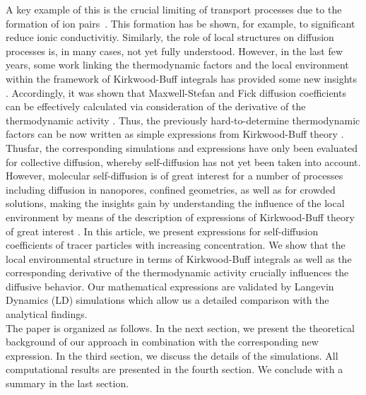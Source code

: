 \documentclass[aip,jcp,reprint]{revtex4-1}
\begin{document}
A key example of this is the crucial limiting of transport processes due to the formation of ion pairs~\cite{marcus06a,vanderVegt16a,smiatek18a,smiatek20a,narayanan18a,smiatek20b,miranda20a,yang20a,krishnamoorthy18b,smiatek19a}.
This formation has be shown, for example, to significant reduce ionic conductivitiy\cite{schroder09a,krishnamoorthy16a,smiatek18a,smiatek20a,krishnamoorthy18c,nandy19a}.
Similarly, the role of local structures on diffusion processes is, in many cases, not yet fully understood. However, in the last few years, some work linking the thermodynamic factors and the local environment within the framework of Kirkwood-Buff integrals has provided some new insights \cite{bardow15a,guevara16a,janzen17a,liu11a,liu13a,rosenberger20a}. Accordingly, it was shown that Maxwell-Stefan and Fick diffusion coefficients can be effectively calculated via consideration of the derivative of the thermodynamic activity \cite{bardow15a,guevara16a,janzen17a,liu11a,liu13a,rosenberger20a}. Thus, the previously hard-to-determine thermodynamic factors can be now written as simple expressions from Kirkwood-Buff theory \cite{kirkwood51,ben13a,pierce08a,smith06,smiatek17a,zingrebe18b,simon22a}. Thusfar, the corresponding simulations and expressions have only been evaluated for collective diffusion, whereby self-diffusion has not yet been taken into account. However,  molecular self-diffusion is of great interest for a number of processes including diffusion in nanopores, confined geometries, as well as for crowded solutions, making the insights gain by understanding the influence of the local environment by means of the description of expressions of Kirkwood-Buff theory of great interest \cite{simon22a,jamali18a,jamali20a,roosen11a,dix08a}.
In this article, we present expressions for self-diffusion coefficients of tracer particles with increasing concentration. We show that the local environmental structure in terms of Kirkwood-Buff integrals as well as the corresponding derivative of the thermodynamic activity crucially influences the diffusive behavior.  Our mathematical expressions are validated by Langevin Dynamics (LD) simulations which allow us a detailed comparison with the analytical findings. \\
The paper is organized as follows. In the next section, we present the theoretical background of our approach in combination with the corresponding new expression. In the third section, we discuss  the details of the 
simulations. All computational results are  presented in the fourth section. 
We conclude with a summary in the last section.
\end{document}
